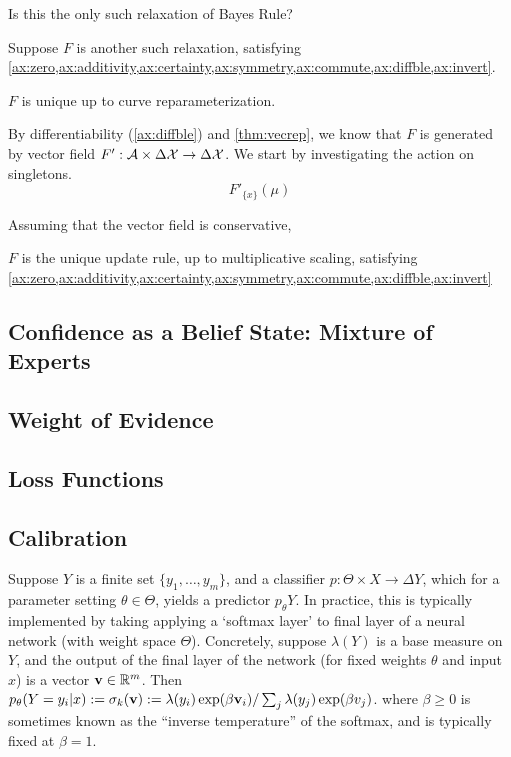 \documentclass{article}
\begin{document}
\begin{wip}
Is this the only such relaxation of Bayes Rule?

Suppose $F$ is another such relaxation, satisfying \cref{ax:zero,ax:additivity,ax:certainty,ax:symmetry,ax:commute,ax:diffble,ax:invert}.

\begin{prop}
	$F$ is unique up to curve reparameterization.
\end{prop}

By differentiability (\cref{ax:diffble}) and \cref{thm:vecrep}, we know that $F$ is generated by vector field $F' : \mathcal A \times \Delta\mathcal X \to \Delta\mathcal X$.
We start by investigating the action on singletons.
\[
	F'_{\{x\}}(\mu)
\]

Assuming that the vector field is conservative,

\begin{conj}
	$F$ is the unique update rule, up to multiplicative scaling, satisfying
	\cref{ax:zero,ax:additivity,ax:certainty,ax:symmetry,ax:commute,ax:diffble,ax:invert}
\end{conj}
\end{wip}


\subsection{Confidence as a Belief State: Mixture of Experts}

\subsection{Weight of Evidence}
\subsection{Loss Functions}
\subsection{Calibration}

Suppose $Y$ is a finite set $\{y_1, \ldots, y_m\}$, and
a classifier $p : \Theta \times X \to \Delta Y$, which for a parameter setting $\theta \in \Theta$, yields a predictor $p_\theta Y$. 
In practice, this is typically implemented by taking applying a `softmax layer' to final layer of a neural network (with weight space $\Theta$). 
Concretely, suppose $\lambda(Y)$ is a base measure on $Y$, and the output of the final layer of the network (for fixed weights $\theta$ and input $x$) is a vector $\mathbf{v}\in \mathbb R^{m}$. 
Then $p_\theta(Y=y_i|x) := \sigma_k(\mathbf{v}) := \lambda(y_i) \exp(\beta \mathbf{v}_i) / \sum_j \lambda(y_j) \exp(\beta v_j)$. 
where $\beta \ge 0$ is sometimes known as the ``inverse temperature'' of the softmax, and is typically fixed at $\beta=1$. 
\end{document}
